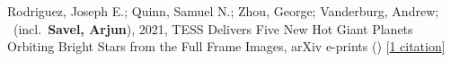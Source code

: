 \item[{\color{numcolor}\scriptsize1}] Rodriguez, Joseph E.; Quinn, Samuel N.; Zhou, George; Vanderburg, Andrew; \etal\ (incl.\ \textbf{Savel, Arjun}), 2021, TESS Delivers Five New Hot Giant Planets Orbiting Bright Stars from the Full Frame Images, arXiv e-prints () [\href{https://ui.adsabs.harvard.edu/abs/2021arXiv210101726R}{1 citation}]